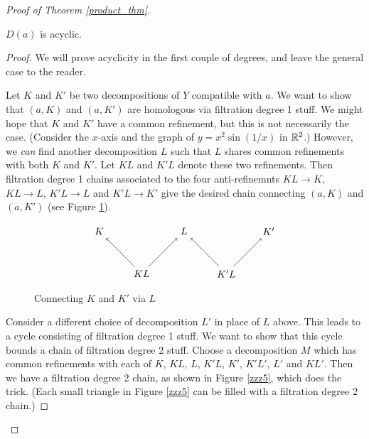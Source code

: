 \begin{proof}[Proof of Theorem \ref{product_thm}]
\begin{lemma}
$D(a)$ is acyclic.
\end{lemma}

\begin{proof}
We will prove acyclicity in the first couple of degrees, and 
leave the general case to the reader.

Let $K$ and $K'$ be two decompositions of $Y$ compatible with $a$.
We want to show that $(a, K)$ and $(a, K')$ are homologous via filtration degree 1 stuff.
We might hope that $K$ and $K'$ have a common refinement, but this is not necessarily
the case.
(Consider the $x$-axis and the graph of $y = x^2\sin(1/x)$ in $\mathbb{R}^2$.)
However, we {\it can} find another decomposition $L$ such that $L$ shares common
refinements with both $K$ and $K'$.
Let $KL$ and $K'L$ denote these two refinements.
Then filtration degree 1 chains associated to the four anti-refinemnts
$KL\to K$, $KL\to L$, $K'L\to L$ and $K'L\to K'$
give the desired chain connecting $(a, K)$ and $(a, K')$
(see Figure \ref{zzz4}).

\begin{figure}[!ht]
\begin{equation*}
\begin{tikzpicture}
\foreach \x/\label in {-3/K, 0/L, 3/K'} {
	\node(\label) at (\x,0) {$\label$};
}
\foreach \x/\la/\lb in {-1.5/K/L, 1.5/K'/L} {
	\node(\la \lb) at (\x,-1.5) {$\la \lb$};
	\draw[->] (\la \lb) -- (\la);
	\draw[->] (\la \lb) -- (\lb); 
}
\end{tikzpicture}
\end{equation*}
\caption{Connecting $K$ and $K'$ via $L$}
\label{zzz4}
\end{figure}

Consider a different choice of decomposition $L'$ in place of $L$ above.
This leads to a cycle consisting of filtration degree 1 stuff.
We want to show that this cycle bounds a chain of filtration degree 2 stuff.
Choose a decomposition $M$ which has common refinements with each of 
$K$, $KL$, $L$, $K'L$, $K'$, $K'L'$, $L'$ and $KL'$.
Then we have a filtration degree 2 chain, as shown in Figure \ref{zzz5}, which does the trick.
(Each small triangle in Figure \ref{zzz5} can be filled with a filtration degree 2 chain.)


\end{proof}
\end{proof}
